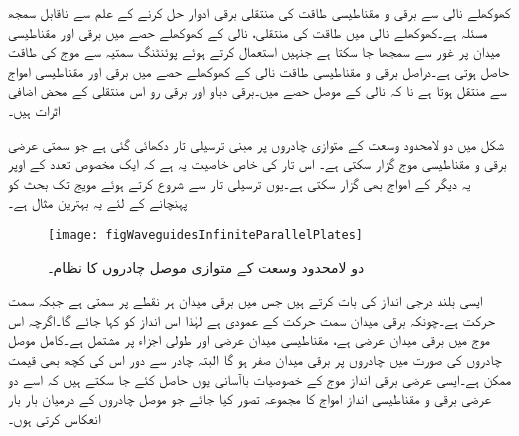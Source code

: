 کھوکھلے نالی سے برقی و مقناطیسی طاقت کی منتقلی برقی ادوار حل کرنے کے علم سے ناقابل سمجھ مسئلہ ہے۔کھوکھلے نالی میں طاقت کی منتقلی، نالی کے کھوکھلے حصے میں برقی اور مقناطیسی میدان پر غور سے سمجھا جا سکتا ہے جنہیں استعمال کرتے ہوئے  پوئنٹنگ سمتیہ سے موج کی طاقت حاصل ہوتی ہے۔دراصل برقی و مقناطیسی طاقت نالی کے کھوکھلے حصے میں برقی اور مقناطیسی امواج سے منتقل ہوتا ہے نا کہ نالی کے موصل حصے میں۔برقی دباو اور برقی رو اس منتقلی کے محض اضافی اثرات ہیں۔ 

شکل  میں دو لامحدود وسعت کے متوازی چادروں پر مبنی ترسیلی تار دکھائی گئی ہے جو  سمتی عرضی برقی و مقناطیسی موج گزار سکتی
 ہے۔ اس تار کی خاص خاصیت یہ ہے کہ ایک مخصوص تعدد کے اوپر یہ دیگر  کے امواج بھی گزار سکتی ہے۔یوں ترسیلی تار سے شروع کرتے ہوئے مویج تک بحث کو پہنچانے  کے لئے یہ بہترین مثال ہے۔

\begin{figure}
\centering
\texttt{[image: figWaveguidesInfiniteParallelPlates]}
\caption{دو لامحدود وسعت کے متوازی موصل چادروں کا نظام۔}
\label{شکل_مویج_لامحدود_متوازی_چادر}
\end{figure}

ایسی بلند درجی انداز کی بات کرتے ہیں جس میں برقی میدان ہر نقطے پر  سمتی ہے جبکہ سمت حرکت  ہے۔چونکہ برقی میدان سمت حرکت کے عمودی ہے لہٰذا اس انداز کو   کہا جائے گا۔اگرچہ اس موج میں برقی میدان عرضی ہے، مقناطیسی میدان عرضی اور طولی اجزاء پر مشتمل ہے۔کامل موصل چادروں کی صورت میں چادروں پر برقی میدان صفر ہو گا البتہ چادر سے دور  اس کی کچھ بھی قیمت ممکن ہے۔ایسی عرضی برقی انداز موج کے خصوصیات باآسانی یوں حاصل کئے جا سکتے ہیں کہ اسے دو عرضی برقی و مقناطیسی انداز  امواج کا مجموعہ تصور کیا جائے جو موصل چادروں کے درمیان بار بار انعکاس کرتی ہوں۔


